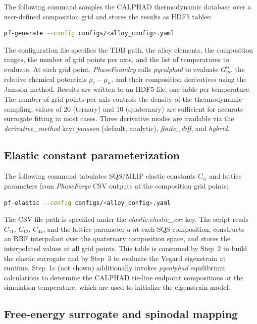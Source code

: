 \documentclass[12pt]{article}
\begin{document}
The following command samples the CALPHAD thermodynamic database over a user-defined composition grid and stores the results as HDF5 tables:
\begin{lstlisting}[language=bash]
pf-generate --config configs/<alloy_config>.yaml
\end{lstlisting}
The configuration file specifies the TDB path, the alloy elements, the composition ranges, the number of grid points per axis, and the list of temperatures to evaluate. At each grid point, \textit{PhaseFoundry} calls \textit{pycalphad} to evaluate $G_m^\alpha$, the relative chemical potentials $\mu_i - \mu_n$, and their composition derivatives using the Jansson method. Results are written to an HDF5 file, one table per temperature. The number of grid points per axis controls the density of the thermodynamic sampling; values of 20 (ternary) and 10 (quaternary) are sufficient for accurate surrogate fitting in most cases. Three derivative modes are available via the \emph{derivative\_method} key: \emph{jansson} (default, analytic), \emph{finite\_diff}, and \emph{hybrid}.

\subsection{Elastic constant parameterization}

The following command tabulates SQS/MLIP elastic constants $C_{ij}$ and lattice parameters from \textit{PhaseForge} CSV outputs at the composition grid points:
\begin{lstlisting}[language=bash]
pf-elastic --config configs/<alloy_config>.yaml
\end{lstlisting}
The CSV file path is specified under the \emph{elastic.elastic\_csv} key. The script reads $C_{11}$, $C_{12}$, $C_{44}$, and the lattice parameter $a$ at each SQS composition, constructs an RBF interpolant over the quaternary composition space, and stores the interpolated values at all grid points. This table is consumed by Step~2 to build the elastic surrogate and by Step~3 to evaluate the Vegard eigenstrain at runtime. Step~1c (not shown) additionally invokes \textit{pycalphad} equilibrium calculations to determine the CALPHAD tie-line endpoint compositions at the simulation temperature, which are used to initialize the eigenstrain model.

\subsection{Free-energy surrogate and spinodal mapping}
\end{document}
